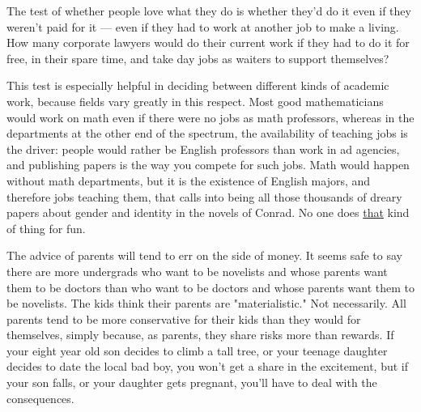 The test of whether people love what
                    they do is whether they'd do it even if they weren't paid
                    for it --- even if they had to work at another job to
                    make a living. How many corporate lawyers would do their
                    current work if they had to do it for free, in their spare
                    time, and take day jobs as waiters to support themselves?

This
                    test is especially helpful in deciding between different
                    kinds of academic work, because fields vary greatly in this
                    respect. Most good mathematicians would work on math even if
                    there were no jobs as math professors, whereas in the
                    departments at the other end of the spectrum, the
                    availability of teaching jobs is the driver: people would
                    rather be English professors than work in ad agencies, and
                    publishing papers is the way you compete for such jobs. Math
                    would happen without math departments, but it is the
                    existence of English majors, and therefore jobs teaching
                    them, that calls into being all those thousands of dreary
                    papers about gender and identity in the novels of Conrad. No
                    one does
                    \href{http://www.google.com/scholar?q=gender+identity+narrative+discourse+transcend}{that}
                    kind of thing for fun.

The advice of parents will
                    tend to err on the side of money. It seems safe to say there
                    are more undergrads who want to be novelists and whose
                    parents want them to be doctors than who want to be doctors
                    and whose parents want them to be novelists. The kids think
                    their parents are "materialistic." Not necessarily. All
                    parents tend to be more conservative for their kids than
                    they would for themselves, simply because, as parents, they
                    share risks more than rewards. If your eight year old son
                    decides to climb a tall tree, or your teenage daughter
                    decides to date the local bad boy, you won't get a share in
                    the excitement, but if your son falls, or your daughter gets
                    pregnant, you'll have to deal with the consequences.

